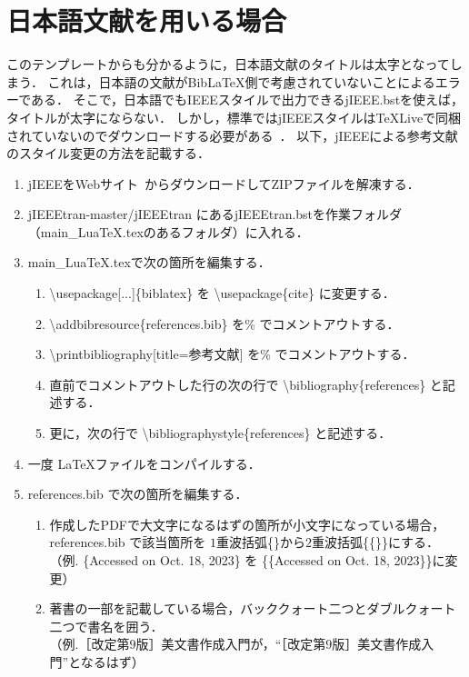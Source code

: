 \chapter{日本語文献を用いる場合}
このテンプレートからも分かるように，日本語文献のタイトルは太字となってしまう．
これは，日本語の文献がBib{\LaTeX}側で考慮されていないことによるエラーである．
そこで，日本語でもIEEEスタイルで出力できるjIEEE.bstを使えば，タイトルが太字にならない．
しかし，標準ではjIEEEスタイルは\TeX Liveで同梱されていないのでダウンロードする必要がある~\cite{jieeetran}．
以下，jIEEEによる参考文献のスタイル変更の方法を記載する．

\begin{enumerate}
    \item jIEEEをWebサイト~\cite{jieeetran}からダウンロードしてZIPファイルを解凍する．
    \item jIEEEtran-master/jIEEEtran にあるjIEEEtran.bstを作業フォルダ（main\_LuaTeX.texのあるフォルダ）に入れる．
    \item main\_LuaTeX.texで次の箇所を編集する．
        \begin{enumerate}
            \item \textbackslash usepackage[...]\{biblatex\} を \textbackslash usepackage\{cite\} に変更する．
            \item \textbackslash addbibresource\{references.bib\} を\% でコメントアウトする．
            \item \textbackslash printbibliography[title={参考文献}] を\% でコメントアウトする．
            \item 直前でコメントアウトした行の次の行で \textbackslash bibliography\{references\} と記述する．
            \item 更に，次の行で \textbackslash bibliographystyle\{references\} と記述する．
        \end{enumerate}
    \item 一度 \LaTeX ファイルをコンパイルする．
    \item references.bib で次の箇所を編集する．
        \begin{enumerate}
            \item 作成したPDFで大文字になるはずの箇所が小文字になっている場合，references.bib で該当箇所を
                $1$重波括弧\{\}から$2$重波括弧\{\{\}\}にする．\\
                （例. \{Accessed on Oct. 18, 2023\} を \{\{Accessed on Oct. 18, 2023\}\}に変更）
            \item 著書の一部を記載している場合，バッククォート二つとダブルクォート二つで書名を囲う．\\
                （例.［改定第$9$版］\LaTeXe 美文書作成入門が，``［改定第$9$版］\LaTeXe 美文書作成入門''となるはず）
        \end{enumerate}
\end{enumerate}